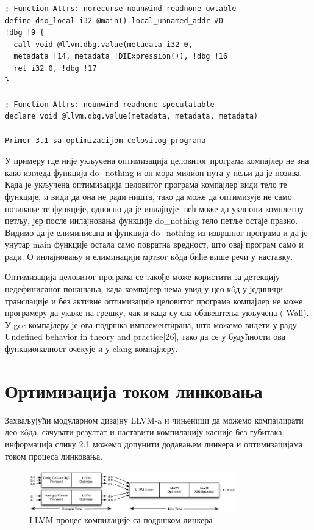 \documentclass[12pt,oneside]{memoir}
\begin{document}
\begin{lstlisting}[frame=single]
; Function Attrs: norecurse nounwind readnone uwtable
define dso_local i32 @main() local_unnamed_addr #0 
!dbg !9 {
  call void @llvm.dbg.value(metadata i32 0, 
  metadata !14, metadata !DIExpression()), !dbg !16
  ret i32 0, !dbg !17
}

; Function Attrs: nounwind readnone speculatable
declare void @llvm.dbg.value(metadata, metadata, metadata)

Primer 3.1 sa optimizacijom celovitog programa
\end{lstlisting}

У примеру где није укључена оптимизација целовитог програма компајлер не зна како
изгледа функција do{\_}nothing и он мора милион пута у пељи да је позива.
Када је укључена оптимизација целовитог програма компајлер види тело те функције,
и види да она не ради ништа, тако да може да оптимизује не само позивање те функције,
односно да је инлајнује, већ може да уклнони комплетну петљу, јер после инлајновања
функције do{\_}nothing тело петље остаје празно.
Видимо да је елиминисана и функција do{\_}nothing из извршног програма и да је унутар
main функције остала само повратна вредност, што овај програм само и ради.
О инлајновању и елиминацији мртвог к\^{o}да биће више речи у наставку.

Оптимизација целовитог програма се такође може користити за детекцију недефинисаног
понашања, када компајлер нема увид у цео к\^{o}д у јединици транслације и без
активне оптимизације целовитог програма компајлер не може програмеру да укаже
на грешку, чак и када су сва обавештења укључена (-Wall).
У gcc компајлеру је ова подршка имплементирана, што можемо видети у раду
Undefined behavior in theory and practice[26], тако да се у будућности ова
функционалност очекује и у clang компајлеру.

\section{Ортимизација током линковања}


Захваљујући модуларном дизајну LLVM-a и чињеници да можемо компајлирати део к\^{o}да,
сачувати резултат и наставити компилацију касније без губитака информација
слику 2.1 можемо допунити додавањем линкера и оптимизацијама током процеса линковања.

\begin{figure}[!ht]
  \centering
  \includegraphics[width=0.8\textwidth]{LTO.png}
  \caption{LLVM процес компилације са подршком линкера}
  \label{fig:grafikon}
\end{figure}
\end{document}
